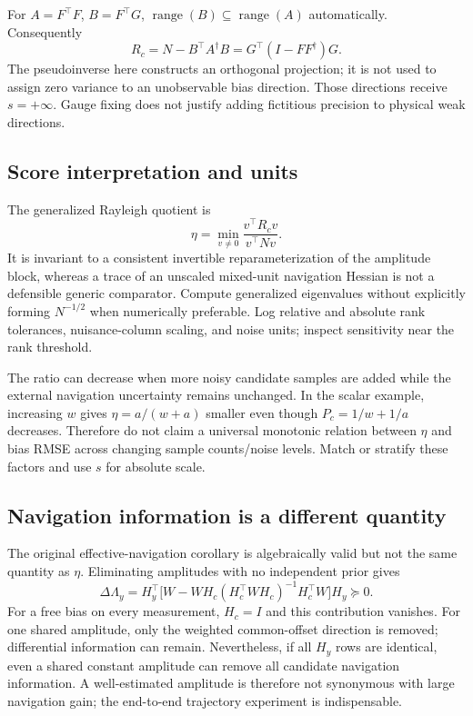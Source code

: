 \documentclass[conference]{IEEEtran}%
\begin{document}
For $A=F^\top F$, $B=F^\top G$, $\operatorname{range}(B)\subseteq\operatorname{range}(A)$ automatically. Consequently
\begin{equation}
 R_c=N-B^\top A^\dagger B=G^\top(I-FF^\dagger)G.
\end{equation}
The pseudoinverse here constructs an orthogonal projection; it is not used to assign zero variance to an unobservable bias direction. Those directions receive $s=+\infty$. Gauge fixing does not justify adding fictitious precision to physical weak directions.

\subsection{Score interpretation and units}
The generalized Rayleigh quotient is
\begin{equation}
 \eta=\min_{v\ne0}\frac{v^\top R_cv}{v^\top Nv}.
\end{equation}
It is invariant to a consistent invertible reparameterization of the amplitude block, whereas a trace of an unscaled mixed-unit navigation Hessian is not a defensible generic comparator. Compute generalized eigenvalues without explicitly forming $N^{-1/2}$ when numerically preferable. Log relative and absolute rank tolerances, nuisance-column scaling, and noise units; inspect sensitivity near the rank threshold.

The ratio can decrease when more noisy candidate samples are added while the external navigation uncertainty remains unchanged. In the scalar example, increasing $w$ gives $\eta=a/(w+a)$ smaller even though $P_c=1/w+1/a$ decreases. Therefore do not claim a universal monotonic relation between $\eta$ and bias RMSE across changing sample counts/noise levels. Match or stratify these factors and use $s$ for absolute scale.

\subsection{Navigation information is a different quantity}
The original effective-navigation corollary is algebraically valid but not the same quantity as $\eta$. Eliminating amplitudes with no independent prior gives
\begin{equation}
 \Delta\Lambda_y=H_y^\top\big[W-WH_c
 (H_c^\top WH_c)^{-1}H_c^\top W\big]H_y\succeq0.
 \label{eq:nav_note}
\end{equation}
For a free bias on every measurement, $H_c=I$ and this contribution vanishes. For one shared amplitude, only the weighted common-offset direction is removed; differential information can remain. Nevertheless, if all $H_y$ rows are identical, even a shared constant amplitude can remove all candidate navigation information. A well-estimated amplitude is therefore not synonymous with large navigation gain; the end-to-end trajectory experiment is indispensable.
\end{document}

